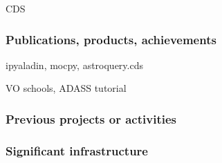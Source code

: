 \begin{sitedescription}{CDS}

%
%






\subsubsection*{Publications, products, achievements}

\begin{compactenum}

  \item ipyaladin, mocpy, astroquery.cds

  \item VO schools, ADASS tutorial

\item {}
\end{compactenum}

\subsubsection*{Previous projects or activities}

\begin{compactenum}
  
\item {}
\end{compactenum}

\subsubsection*{Significant infrastructure}

\end{sitedescription}
